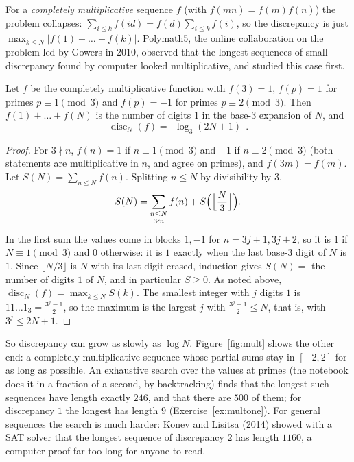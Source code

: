 For a \emph{completely multiplicative} sequence $f$ (with $f(mn)=f(m)f(n)$) the problem collapses: $\sum_{i\le k}f(id)=f(d)\sum_{i\le k}f(i)$, so the
discrepancy is just $\max_{k\le N}|f(1)+\dots+f(k)|$. Polymath5, the online collaboration on the problem led by Gowers in 2010, observed that the longest
sequences of small discrepancy found by computer looked multiplicative, and studied this case first.

\begin{proposition}\label{prop:bcc}
Let $f$ be the completely multiplicative function with $f(3)=1$, $f(p)=1$ for primes $p\equiv1\pmod3$ and $f(p)=-1$ for primes $p\equiv2\pmod3$. Then
$f(1)+\dots+f(N)$ is the number of digits $1$ in the base-$3$ expansion of $N$, and
\[
\operatorname{disc}_N(f)=\bigl\lfloor\log_3(2N+1)\bigr\rfloor .
\]
\end{proposition}
\begin{proof}
For $3\nmid n$, $f(n)=1$ if $n\equiv1\pmod3$ and $-1$ if $n\equiv2\pmod3$ (both statements are multiplicative in $n$, and agree on primes), and
$f(3m)=f(m)$. Let $S(N)=\sum_{n\le N}f(n)$. Splitting $n\le N$ by divisibility by $3$,
\[
S(N)=\sum_{\substack{n\le N\\3\nmid n}}f(n)+S\Bigl(\Bigl\lfloor\frac N3\Bigr\rfloor\Bigr).
\]
In the first sum the values come in blocks $1,-1$ for $n=3j+1,3j+2$, so it is $1$ if $N\equiv1\pmod3$ and $0$ otherwise: it is $1$ exactly when the last
base-$3$ digit of $N$ is $1$. Since $\lfloor N/3\rfloor$ is $N$ with its last digit erased, induction gives $S(N)=$ the number of digits $1$ of $N$, and in
particular $S\ge0$. As noted above, $\operatorname{disc}_N(f)=\max_{k\le N}S(k)$. The smallest integer with $j$ digits $1$ is $11\dots1_3=\frac{3^j-1}2$, so the
maximum is the largest $j$ with $\frac{3^j-1}2\le N$, that is, with $3^j\le2N+1$.
\end{proof}

So discrepancy can grow as slowly as $\log N$. Figure~\ref{fig:mult} shows the other end: a completely multiplicative sequence whose partial sums stay in
$[-2,2]$ for as long as possible. An exhaustive search over the values at primes (the notebook does it in a fraction of a second, by backtracking) finds that
the longest such sequences have length exactly $246$, and that there are $500$ of them; for discrepancy $1$ the longest has length $9$
(Exercise~\ref{ex:multone}). For general sequences the search is much harder: Konev and Lisitsa (2014) showed with a SAT solver that the longest sequence of
discrepancy $2$ has length $1160$, a computer proof far too long for anyone to read.

